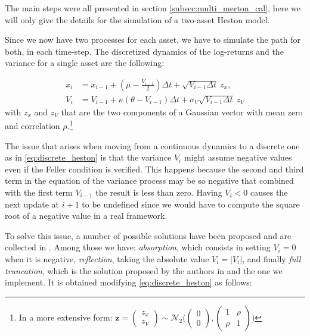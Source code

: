 The main steps were all presented in section \ref{subsec:multi_merton_cal}, here we will only give the details for the simulation of a two-asset Heston model.

Since we now have two processes for each asset, we have to simulate the path for both, in each time-step.
The discretized dynamics of the log-returns and the variance for a single asset are the following:

\begin{subequations}
	\label{eq:discrete_heston}
	\begin{align}
		x_i &= x_{i-1} + (\mu -  \frac{V_{i-1}}{2})\Delta t + \sqrt{V_{i-1} \Delta t} \:z_x, \\
		V_i &= V_{i-1} + \kappa(\theta - V_{i-1} )\Delta t + \sigma_V \sqrt{V_{i-1} \Delta t} \: z_V
	\end{align}
\end{subequations}
with $z_x$ and $z_V$ that are the two components of a Gaussian vector with mean zero and correlation $\rho$.\footnote{In a more extensive form: $ \mathbf{z} = \begin{pmatrix}
	z_x\\ z_V
	\end{pmatrix} \sim \mathcal{N}_2 \Big(\begin{pmatrix}
	0\\ 0\end{pmatrix}, \begin{pmatrix}
	1& \rho\\ \rho&1
	\end{pmatrix} \Big)$}

The issue that arises when moving from a continuous dynamics to a discrete one as in \eqref{eq:discrete_heston} is that the variance $V_i$ might assume negative values even if the Feller condition is verified. This happens because the second and third term in the equation of the variance process may be so negative that combined with the first term $V_{i-1}$ the result is less than zero.
Having $V_i < 0$ causes the next update at $i+1$ to be undefined since we would have to compute the square root of a negative value in a real framework.

To solve this issue, a number of possible solutions have been proposed and are collected in \citep{LORD2010}. Among those we have:
\textit{absorption}, which consists in setting $V_i = 0$ when it is negative, \textit{reflection}, taking the absolute value $V_i = |V_i|$, and finally \textit{full truncation}, which is the solution proposed  by the authors in \citep{LORD2010} and the one we  implement. It is obtained modifying \eqref{eq:discrete_heston} as follows:


